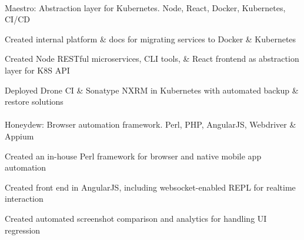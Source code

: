 \begin{position}

  \paragraph{} Maestro: Abstraction layer for Kubernetes. Node, React, Docker, Kubernetes, CI/CD
  \begin{myitem}
  \item Created internal platform \& docs for migrating services to Docker \& Kubernetes
  \item Created Node RESTful microservices, CLI tools, \& React frontend as abstraction layer for K8S API
  \item Deployed Drone CI \& Sonatype NXRM in Kubernetes with automated backup \& restore solutions
  \end{myitem}
  \paragraph{} Honeydew: Browser automation framework. Perl, PHP, AngularJS, Webdriver \& Appium
  \begin{myitem}
  \item Created an in-house Perl framework for browser and native mobile app automation
  \item Created front end in AngularJS, including websocket-enabled REPL for realtime interaction
  \item Created automated screenshot comparison and analytics for handling UI regression
  \end{myitem}

\end{position}
